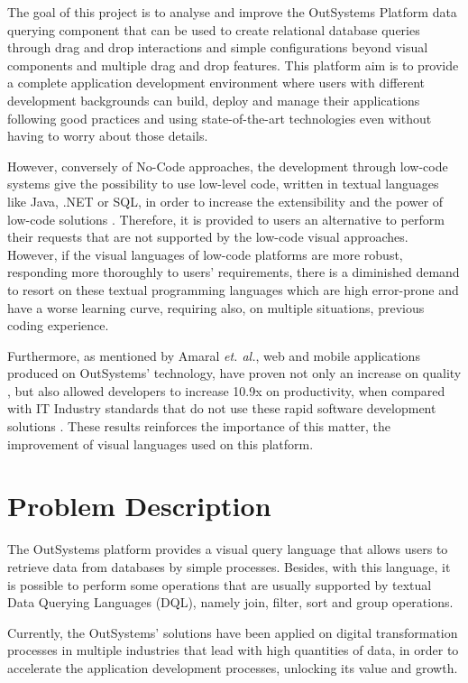 The goal of this project is to analyse and improve the OutSystems Platform \cite{outsystemsPlatform} data querying component that can be used to create relational database queries through drag and drop interactions and simple configurations beyond visual components and multiple drag and drop features. This platform aim is to provide a complete application development environment where users with different development backgrounds can build, deploy and manage their applications following good practices and using state-of-the-art technologies even without having to worry about those details.

However, conversely of No-Code approaches, the development through low-code systems give the possibility to use low-level code, written in textual languages like Java, .NET or SQL, in order to increase the extensibility and the power of low-code solutions \cite{outsystems_lowcodeVsNocode}. Therefore, it is provided to users an alternative to perform their requests that are not supported by the low-code visual approaches. However, if the visual languages of low-code platforms are more robust, responding more thoroughly to users’ requirements, there is a diminished demand to resort on these textual programming languages which are high error-prone and have a worse learning curve, requiring also, on multiple situations, previous coding experience.

Furthermore, as mentioned by  Amaral \textit{et. al.}, web and mobile applications produced on OutSystems’ technology, have proven not only an increase on quality \cite{improvingTheDeveloperExperienceWithALowCodeProcessModellingLanguage}, but also allowed developers to increase 10.9x on productivity, when compared with  IT Industry standards that do not use these rapid software development solutions \cite{outByNumbers2013}. These results reinforces the importance of this matter, the improvement of visual languages used on this platform.


\section{Problem Description}
\label{sec:problem_description}
The OutSystems platform provides a visual query language that allows users to retrieve data from databases by simple processes. Besides, with this language, it is possible to perform some operations that are usually supported by textual Data Querying Languages (DQL), namely join, filter, sort and group operations.

Currently, the OutSystems’ solutions have been applied on digital transformation processes in multiple industries that lead with high quantities of data, in order to accelerate the application development processes, unlocking its value and growth.

